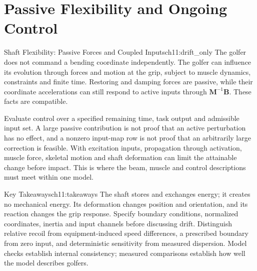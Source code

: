 \section{Passive Flexibility and Ongoing Control}
\begin{driftcontrol}{Shaft Flexibility: Passive Forces and Coupled Inputs}{ch11:drift_only}
The golfer does not command a bending coordinate independently. The golfer can influence its evolution through forces and motion at the grip, subject to muscle dynamics, constraints and finite time. Restoring and damping forces are passive, while their coordinate accelerations can still respond to active inputs through $\mathbf M^{-1}\mathbf B$. These facts are compatible.
\end{driftcontrol}

Evaluate control over a specified remaining time, task output and admissible input set. A large passive contribution is not proof that an active perturbation has no effect, and a nonzero input-map row is not proof that an arbitrarily large correction is feasible. With excitation inputs, propagation through activation, muscle force, skeletal motion and shaft deformation can limit the attainable change before impact. This is where the beam, muscle and control descriptions must meet within one model.

\begin{principle}{Key Takeaways}{ch11:takeaways}
The shaft stores and exchanges energy; it creates no mechanical energy. Its deformation changes position and orientation, and its reaction changes the grip response. Specify boundary conditions, normalized coordinates, inertia and input channels before discussing drift. Distinguish relative recoil from equipment-induced speed differences, a prescribed boundary from zero input, and deterministic sensitivity from measured dispersion. Model checks establish internal consistency; measured comparisons establish how well the model describes golfers.
\end{principle}


